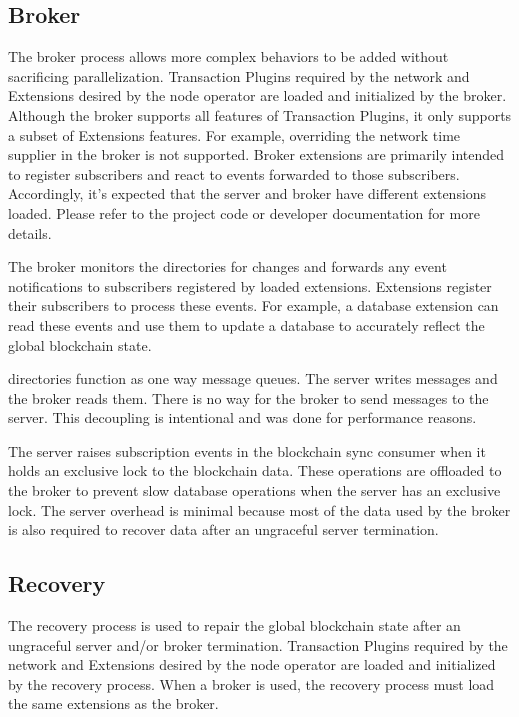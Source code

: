 \subsection{Broker}

The broker process allows more complex \codenamespace behaviors to be added without sacrificing parallelization.
Transaction Plugins required by the network and \codenamespace Extensions desired by the node operator are loaded and initialized by the broker.
Although the broker supports all features of Transaction Plugins, it only supports a subset of \codenamespace Extensions features.
For example, overriding the network time supplier in the broker is not supported.
Broker extensions are primarily intended to register subscribers and react to events forwarded to those subscribers.
Accordingly, it's expected that the server and broker have different extensions loaded.
Please refer to the project code or developer documentation for more details.

The broker monitors the  directories for changes and forwards any event notifications to subscribers registered by loaded extensions.
Extensions register their subscribers to process these events.
For example, a database extension can read these events and use them to update a database to accurately reflect the global blockchain state.

 directories function as one way message queues.
The server writes messages and the broker reads them.
There is no way for the broker to send messages to the server.
This decoupling is intentional and was done for performance reasons.

The server raises subscription events in the blockchain sync consumer  when it holds an exclusive lock to the blockchain data.
These operations are offloaded to the broker to prevent slow database operations when the server has an exclusive lock.
The server overhead is minimal because most of the data used by the broker is also required to recover data after an ungraceful server termination.

\subsection{Recovery}

The recovery process is used to repair the global blockchain state after an ungraceful server and/or broker termination.
Transaction Plugins required by the network and \codenamespace Extensions desired by the node operator are loaded and initialized by the recovery process.
When a broker is used, the recovery process must load the same extensions as the broker.

